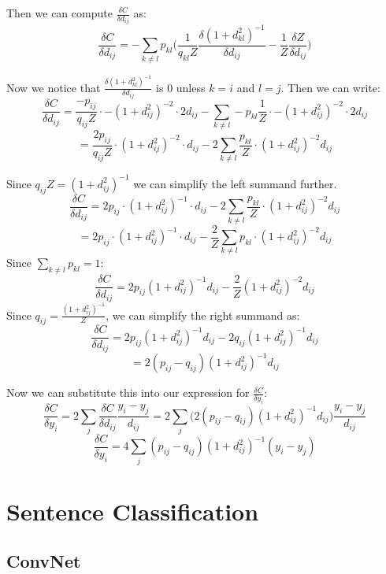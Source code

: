 \documentclass[a4paper]{article}
\begin{document}
\begin{enumerate}
{Then we can compute $\frac{ \delta C }{\delta d_{ij} }$ as:
$$\frac{ \delta C }{\delta d_{ij} } = - \sum_{k \neq l} p_{kl} \Big( \frac{1}{q_{kl} Z }  \frac{\delta (1+d_{kl}^2)^{-1}  }{\delta d_{ij}} - \frac{1}{Z} \frac{\delta Z }{\delta d_{ij}} \Big) $$

Now we notice that $\frac{\delta (1+d_{kl}^2)^{-1} }{\delta d_{ij}}$ is $0$ unless $k=i$ and $l=j$. Then we can write:
$$\frac{ \delta C }{\delta d_{ij} } =  \frac{ - p_{ij} }{q_{ij} Z } \cdot -  (1+d_{ij}^2)^{-2} \cdot 2 d_{ij} - \sum_{k \neq l} - p_{kl} \frac{1}{Z} \cdot -(1 + d_{ij}^2)^{-2} \cdot 2 d_{ij}$$
$$ =  \frac{  2 p_{ij} }{q_{ij} Z } \cdot (1+d_{ij}^2)^{-2} \cdot d_{ij} - 2 \sum_{k \neq l}  \frac{ p_{kl}}{Z} \cdot (1 + d_{ij}^2)^{-2} d_{ij} $$

Since $q_{ij} Z = (1+d_{ij}^2)^{-1}$ we can simplify the left summand further.
$$\frac{ \delta C }{\delta d_{ij} }  =   2 p_{ij} \cdot (1+d_{ij}^2)^{-1} \cdot d_{ij} - 2 \sum_{k \neq l}  \frac{ p_{kl}}{Z} \cdot (1 + d_{ij}^2)^{-2} d_{ij} $$
$$ =   2 p_{ij} \cdot (1+d_{ij}^2)^{-1} \cdot d_{ij} - \frac{2}{Z} \sum_{k \neq l}  p_{kl} \cdot (1 + d_{ij}^2)^{-2} d_{ij} $$
Since $\sum_{k \neq l} p_{kl} = 1$:
$$\frac{ \delta C }{\delta d_{ij} }  =   2 p_{ij}  (1+d_{ij}^2)^{-1}  d_{ij} - \frac{2}{Z} (1 + d_{ij}^2)^{-2} d_{ij} $$
Since $q_{ij} = \frac{(1+d_{ij}^2)^{-1} }{  Z }$, we can simplify the right summand as:
$$\frac{ \delta C }{\delta d_{ij} }  =   2 p_{ij}  (1+d_{ij}^2)^{-1}  d_{ij} - 2 q_{ij} (1 + d_{ij}^2)^{-1} d_{ij} $$
$$ = 2 (p_{ij} - q_{ij}) (1+d_{ij}^2)^{-1}  d_{ij} $$

Now we can substitute this into our expression for $\frac{\delta C }{\delta y_i}$:
$$\frac{\delta C }{\delta y_i} = 2 \sum_j  \frac{\delta C }{\delta d_{ij}}  \frac{y_i - y_j}{ d_{ij} } = 2 \sum_j  \Big( 2 (p_{ij} - q_{ij}) (1+d_{ij}^2)^{-1}  d_{ij}  \Big) \frac{y_i - y_j}{ d_{ij} }$$
$$\frac{\delta C }{\delta y_i}  = 4 \sum_j  (p_{ij} - q_{ij}) (1+d_{ij}^2)^{-1} (y_i - y_j)$$

}
\end{enumerate}

\section{Sentence Classification}


\subsection{ConvNet}
\end{document}
